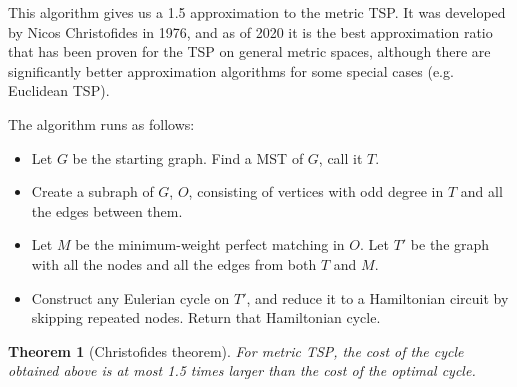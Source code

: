 \documentclass[12pt,twoside,notitlepage]{report}
\newtheorem{theorem}{Theorem}
\begin{document}
This algorithm gives us a 1.5 approximation to the metric TSP. It was developed by Nicos Christofides in 1976\cite{christofides1976worst}, and as of 2020 it is the best approximation ratio that has been proven for the TSP on general metric spaces, although there are significantly better approximation algorithms for some special cases (e.g. Euclidean TSP).

The algorithm runs as follows:

\begin{itemize}

\item Let $G$ be the starting graph. Find a MST of $G$, call it $T$.
\item Create a subraph of $G$, $O$, consisting of vertices with odd degree in $T$ and all the edges between them.
\item Let $M$ be the minimum-weight perfect matching in $O$. Let $T'$ be the graph with all the nodes and all the edges from both $T$ and $M$.
\item Construct any Eulerian cycle on $T'$, and reduce it to a Hamiltonian circuit by skipping repeated nodes. Return that Hamiltonian cycle.

\end{itemize}

\begin{theorem}[Christofides theorem]

For metric TSP, the cost of the cycle obtained above is at most 1.5 times larger than the cost of the optimal cycle.

\end{theorem}
\end{document}
